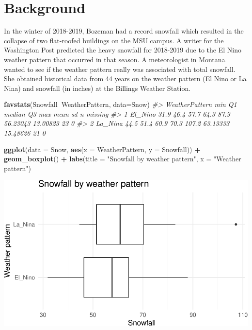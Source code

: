 \documentclass[
]{report}
\newenvironment{Shaded}{\begin{snugshade}}{\end{snugshade}}
\newcommand{\CommentTok}[1]{\textcolor[rgb]{0.56,0.35,0.01}{\textit{#1}}}
\newcommand{\DataTypeTok}[1]{\textcolor[rgb]{0.13,0.29,0.53}{#1}}
\newcommand{\KeywordTok}[1]{\textcolor[rgb]{0.13,0.29,0.53}{\textbf{#1}}}
\newcommand{\NormalTok}[1]{#1}
\newcommand{\OperatorTok}[1]{\textcolor[rgb]{0.81,0.36,0.00}{\textbf{#1}}}
\newcommand{\StringTok}[1]{\textcolor[rgb]{0.31,0.60,0.02}{#1}}
\begin{document}
\hypertarget{background-1}{%
\section{Background}\label{background-1}}

In the winter of 2018-2019, Bozeman had a record snowfall which resulted in the collapse of two flat-roofed buildings on the MSU campus. A writer for the Washington Post predicted the heavy snowfall for 2018-2019 due to the El Nino weather pattern that occurred in that season. A meteorologist in Montana wanted to see if the weather pattern really was associated with total snowfall. She obtained historical data from 44 years on the weather pattern (El Nino or La Nina) and snowfall (in inches) at the Billings Weather Station.

\begin{Shaded}
\begin{Highlighting}[]
\KeywordTok{favstats}\NormalTok{(Snowfall}\OperatorTok{~}\NormalTok{WeatherPattern, }\DataTypeTok{data=}\NormalTok{Snow)}
\CommentTok{#>   WeatherPattern  min   Q1 median   Q3   max     mean       sd  n missing}
\CommentTok{#> 1        El_Nino 31.9 46.4   57.7 64.3  87.9 56.23043 13.00823 23       0}
\CommentTok{#> 2        La_Nina 44.5 51.4   60.9 70.3 107.2 63.13333 15.48626 21       0}
\end{Highlighting}
\end{Shaded}

\begin{Shaded}
\begin{Highlighting}[]
\KeywordTok{ggplot}\NormalTok{(}\DataTypeTok{data =}\NormalTok{ Snow,}
       \KeywordTok{aes}\NormalTok{(}\DataTypeTok{x =}\NormalTok{ WeatherPattern, }\DataTypeTok{y =}\NormalTok{ Snowfall)) }\OperatorTok{+}
\StringTok{    }\KeywordTok{geom_boxplot}\NormalTok{() }\OperatorTok{+}\StringTok{ }
\StringTok{    }\KeywordTok{labs}\NormalTok{(}\DataTypeTok{title =} \StringTok{"Snowfall by weather pattern"}\NormalTok{,}
         \DataTypeTok{x =} \StringTok{"Weather pattern"}\NormalTok{)}
\end{Highlighting}
\end{Shaded}

\begin{center}\includegraphics[width=0.7\linewidth]{09-inference-2quant_files/figure-latex/unnamed-chunk-3-1} \end{center}
\end{document}
